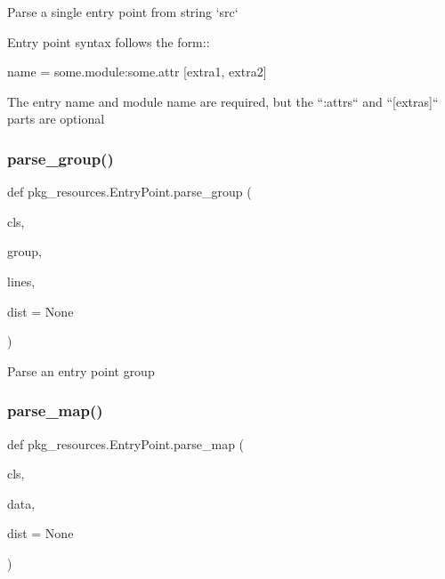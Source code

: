 \begin{DoxyVerb}Parse a single entry point from string `src`

Entry point syntax follows the form::

    name = some.module:some.attr [extra1, extra2]

The entry name and module name are required, but the ``:attrs`` and
``[extras]`` parts are optional
\end{DoxyVerb}
 \mbox{\label{classpkg__resources_1_1EntryPoint_aa6103add7859c9b6e0338b6866fe44ba}} 
\subsubsection{\texorpdfstring{parse\+\_\+group()}{parse\_group()}}
{\footnotesize\ttfamily def pkg\+\_\+resources.\+Entry\+Point.\+parse\+\_\+group (\begin{DoxyParamCaption}\item[{}]{cls,  }\item[{}]{group,  }\item[{}]{lines,  }\item[{}]{dist = {\ttfamily None} }\end{DoxyParamCaption})}

\begin{DoxyVerb}Parse an entry point group\end{DoxyVerb}
 \mbox{\label{classpkg__resources_1_1EntryPoint_a925bbccfaed5f41e1f676adb88199afa}} 
\subsubsection{\texorpdfstring{parse\+\_\+map()}{parse\_map()}}
{\footnotesize\ttfamily def pkg\+\_\+resources.\+Entry\+Point.\+parse\+\_\+map (\begin{DoxyParamCaption}\item[{}]{cls,  }\item[{}]{data,  }\item[{}]{dist = {\ttfamily None} }\end{DoxyParamCaption})}

